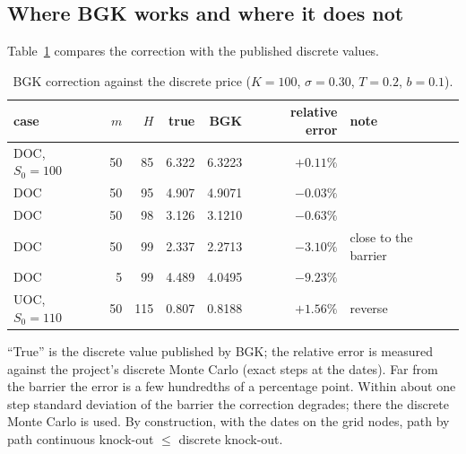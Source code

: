 \subsection{Where BGK works and where it does not}
Table~\ref{tab:bgk} compares the correction with the published discrete values.

\begin{table}[htb]
\centering
\small
\caption{BGK correction against the discrete price ($K=100$, $\sigma=0.30$, $T=0.2$, $b=0.1$).}
\label{tab:bgk}
\begin{tabular*}{\textwidth}{@{\extracolsep{\fill}}lrrrrrl@{}}
\toprule
case & $m$ & $H$ & true & BGK & relative error & note\\
\midrule
DOC, $S_0=100$ & 50 & 85 & 6.322 & 6.3223 & $+0.11\%$ & \\
DOC & 50 & 95 & 4.907 & 4.9071 & $-0.03\%$ & \\
DOC & 50 & 98 & 3.126 & 3.1210 & $-0.63\%$ & \\
DOC & 50 & 99 & 2.337 & 2.2713 & $-3.10\%$ & close to the barrier\\
DOC & 5 & 99 & 4.489 & 4.0495 & $-9.23\%$ & \\
UOC, $S_0=110$ & 50 & 115 & 0.807 & 0.8188 & $+1.56\%$ & reverse\\
\bottomrule
\end{tabular*}
\end{table}

``True'' is the discrete value published by BGK; the relative error is measured against the project's discrete Monte
Carlo (exact steps at the dates). Far from the barrier the error is a few hundredths of a percentage point. Within
about one step standard deviation of the barrier the correction degrades; there the discrete Monte Carlo is used. By
construction, with the dates on the grid nodes, path by path continuous knock-out $\le$ discrete knock-out.

